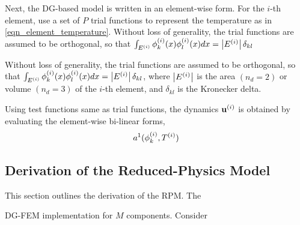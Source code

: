 Next, the DG-based model is written in an element-wise form. For the $i$-th element, use a set of $P$ trial functions to represent the temperature as in \cref{eqn_element_temperature}. Without loss of generality, the trial functions are assumed to be orthogonal, so that $\int_{E^{(i)}} \phi^{(i)}_k(x) \phi^{(i)}_l(x) dx = \left|E^{(i)}\right|\delta_{kl}$


Without loss of generality, the trial functions are assumed to be orthogonal, so that $\int_{E^{(i)}} \phi^{(i)}_k(x) \phi^{(i)}_l(x) dx = \left|E^{(i)}\right|\delta_{kl}$, where $\left|E^{(i)}\right|$ is the area $(n_d=2)$ or volume $(n_d=3)$ of the $i$-th element, and $\delta_{kl}$ is the Kronecker delta. 

Using test functions same as trial functions, the dynamics $\mathbf{u}^{(i)}$ is obtained by evaluating the element-wise bi-linear forms,
\begin{equation}
    a^{1}(\phi_k^{(i)},T^{(i)})
\end{equation}

\subsection{Derivation of the Reduced-Physics Model}

This section outlines the derivation of the RPM. The 


DG-FEM implementation for $M$ components. Consider 




